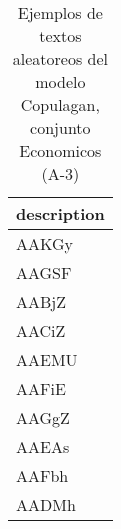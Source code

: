 \begin{table}[H]
\centering
\fontsize{8}{14}\selectfont
\caption{Ejemplos de textos aleatoreos del modelo Copulagan, conjunto Economicos (A-3)}
\label{table-sample10-economicos-a-3-copulagan-text}
\begin{tabular}{|m{50em}|}
\hline
\rowcolor[gray]{0.8}
description \\
\hline AAKGy \\
\hline AAGSF \\
\hline AABjZ \\
\hline AACiZ \\
\hline AAEMU \\
\hline AAFiE \\
\hline AAGgZ \\
\hline AAEAs \\
\hline AAFbh \\
\hline AADMh \\
\hline
\end{tabular}
\end{table}
